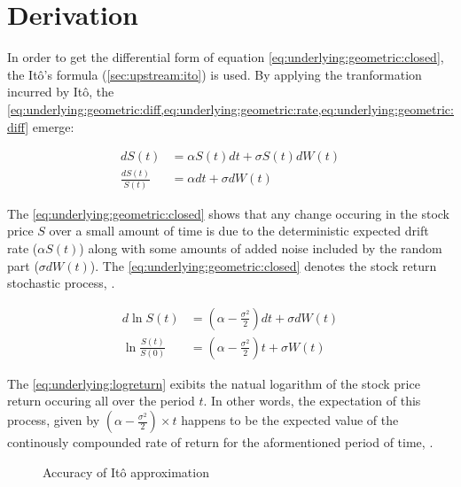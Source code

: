 \documentclass[12pt]{report}
\newcommand{\dBm}{dW\left(t\right)}
\newcommand{\Bm}{W\left(t\right)}
\newcommand{\St}{S\left(t\right)}
\newcommand{\dSt}{dS\left(t\right)}
\newcommand{\dSr}{\frac{\dSt}{\St}}
\newcommand{\Scontinousdiff}{d\St &= \alpha \St dt + \sigma \St \dBm}
\newcommand{\Scontinuousrate}{\dSr &= \alpha dt + \sigma \dBm}
\begin{document}
\section{Derivation}
\label{sec:underlying:derivation}

In order to get the differential form of equation \ref{eq:underlying:geometric:closed}, the Itô's formula (\cref{sec:upstream:ito}) is used. By applying the tranformation incurred by Itô, the \cref{eq:underlying:geometric:diff,eq:underlying:geometric:rate,eq:underlying:geometric:diff} emerge:
 
\begin{center}
  \begin{subequations}
    \begin{align}
      \Scontinousdiff \label{eq:underlying:geometric:diff} \\
      \Scontinuousrate \label{eq:underlying:geometric:rate}
    \end{align}
  \end{subequations}
\end{center}

The \cref{eq:underlying:geometric:closed} shows that any change occuring in the stock price $S$ over a small amount of time is due to the deterministic expected drift rate ($\alpha \St$) along with some amounts of added noise included by the random part ($\sigma d\Bm$). The \cref{eq:underlying:geometric:closed} denotes the stock return stochastic process, \citet{hull}.

\begin{align}
  d\ln{\St} &= (\alpha - \frac{\sigma ^2}{2}) dt 
              + \sigma d\Bm \label{eq:underlying:logreturn:diff} \\
  \ln{\frac{\St}{S(0)}} &= (\alpha - \frac{\sigma ^2}{2}) t 
              + \sigma \Bm \label{eq:underlying:log:return}
\end{align}

The \cref{eq:underlying:logreturn} exibits the natual logarithm of the stock price return occuring all over the period $t$. In other words, the expectation of this process, given by $(\alpha - \frac{\sigma ^2}{2}) \times t$ happens to be the expected value of the continously compounded rate of return for the aformentioned period of time, \citet{hull}.


\begin{figure}[h]
\centering

\caption{Accuracy of Itô approximation}
\label{p:itoaccuracy}
\end{figure}
\end{document}
